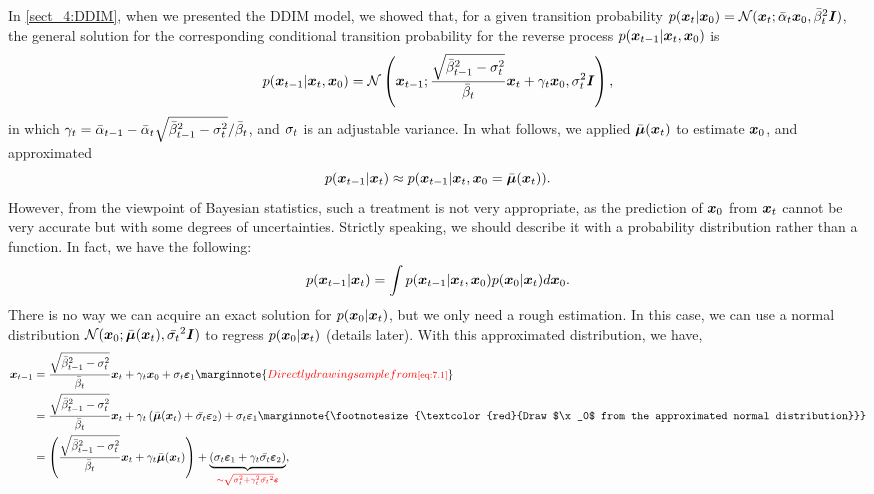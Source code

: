 In \cref{sect_4:DDIM}, when we presented the DDIM model, we showed that, for a given transition probability $p(\bm{x}_{t}|\bm{x}_0)=\mathcal{N}(\bm{x}_{t};\bar{\alpha}_t\bm{x}_0,\bar{\beta}_t^2\bm{I})$, the general solution for the corresponding conditional transition probability for the reverse process $p(\bm{x}_{t-1}|\bm{x}_{t},\bm{x}_0)$ is 
\begin{equation}
    \label{eq:7.1}
    p(\bm{x}_{t-1}|\bm{x}_{t},\bm{x}_0)=\mathcal{N}\left( \bm{x}_{t-1};\frac{\sqrt{\bar{\beta}_{t-1}^2-\sigma_t^2}}{\bar{\beta}_t}\bm{x}_{t}+\gamma_t\bm{x}_0,\sigma_t^2\bm{I} \right),
\end{equation}
in which $\gamma_t=\bar{\alpha}_{t-1}-\bar{\alpha}_t\sqrt{\bar{\beta}_{t-1}^2-\sigma_t^2}/\bar{\beta}_t$, and $\sigma_t$ is an adjustable variance. In what follows, we applied $\bar{\bm{\mu}}(\bm{x}_{t})$ to estimate $\x_0$, and approximated
\begin{equation}
    \label{eq:7.2}
    p(\bm{x}_{t-1}|\bm{x}_{t})\approx p(\bm{x}_{t-1}|\bm{x}_{t},\bm{x}_0=\bar{\bm{\mu}}(\bm{x}_{t})).
\end{equation}
However, from the viewpoint of Bayesian statistics, such a treatment is not very appropriate, as the prediction of $\x_0$ from $\xt$ cannot be very accurate but with some degrees of uncertainties. Strictly speaking, we should describe it with a probability distribution rather than a function. In fact, we have the following:\marginnote{\footnotesize{
\textcolor{red}{Marginalisation over all possible transitions from $\xt$ to $\x_0$..}
}}
\begin{equation}
    \label{eq:7.3}
    p(\bm{x}_{t-1}|\bm{x}_{t})=\int p(\bm{x}_{t-1}|\bm{x}_{t},\bm{x}_0) p(\bm{x}_0|\bm{x}_{t})d\bm{x}_0.
\end{equation}
There is no way we can acquire an exact solution for $p(\bm{x}_0|\bm{x}_{t})$, but we only need a rough estimation. In this case, we can use a normal distribution $\mathcal{N}(\bm{x}_0;\bar{\bm{\mu}}(\bm{x}_{t}),\bar{\sigma_t}^2\bm{I})$ to regress $p(\bm{x}_0|\bm{x}_{t})$ (details later). With this approximated distribution, we have,
\begin{align}
    \xtm&= \frac{\sqrt{\betatmbar^2-\sigmat^2}}{\betatbar}\xt+\gamma_t\x_0+\sigmat\bm{\varepsilon}_1 \marginnote{\footnotesize{\textcolor{red}{Directly drawing sample from \cref{eq:7.1}}}} \nonumber \\
    &=\frac{\sqrt{\betatmbar^2-\sigmat^2}}{\betatbar}\xt+\gamma_t\left(\mubarxt+\bar{\sigmat}\bm{\varepsilon}_2\right) +  \sigmat\bm{\varepsilon}_1 \marginnote{\footnotesize{\textcolor{red}{Draw $\x_0$ from the approximated normal distribution}}}\nonumber\\
    &= \left( \frac{\sqrt{\betatmbar^2-\sigmat^2}}{\betatbar}\xt+\gamma_t\mubarxt \right)+ \underbrace{\left(\sigmat\bm{\varepsilon}_1+\gamma_t\bar{\sigmat} \bm{\varepsilon}_2\right)}_{\textcolor{red}{\sim\sqrt{\sigmat^2+\gamma_t^2\bar{\sigmat}^2}\bm{\varepsilon}}},\label{eq:7.4}
\end{align}
